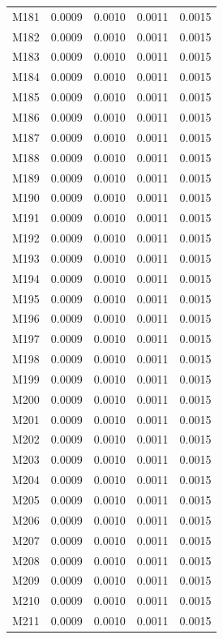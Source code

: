 \begin{longtable}{lrrrr}
M181 & 0.0009 & 0.0010 & 0.0011 & 0.0015 \\
M182 & 0.0009 & 0.0010 & 0.0011 & 0.0015 \\
M183 & 0.0009 & 0.0010 & 0.0011 & 0.0015 \\
M184 & 0.0009 & 0.0010 & 0.0011 & 0.0015 \\
M185 & 0.0009 & 0.0010 & 0.0011 & 0.0015 \\
M186 & 0.0009 & 0.0010 & 0.0011 & 0.0015 \\
M187 & 0.0009 & 0.0010 & 0.0011 & 0.0015 \\
M188 & 0.0009 & 0.0010 & 0.0011 & 0.0015 \\
M189 & 0.0009 & 0.0010 & 0.0011 & 0.0015 \\
M190 & 0.0009 & 0.0010 & 0.0011 & 0.0015 \\
M191 & 0.0009 & 0.0010 & 0.0011 & 0.0015 \\
M192 & 0.0009 & 0.0010 & 0.0011 & 0.0015 \\
M193 & 0.0009 & 0.0010 & 0.0011 & 0.0015 \\
M194 & 0.0009 & 0.0010 & 0.0011 & 0.0015 \\
M195 & 0.0009 & 0.0010 & 0.0011 & 0.0015 \\
M196 & 0.0009 & 0.0010 & 0.0011 & 0.0015 \\
M197 & 0.0009 & 0.0010 & 0.0011 & 0.0015 \\
M198 & 0.0009 & 0.0010 & 0.0011 & 0.0015 \\
M199 & 0.0009 & 0.0010 & 0.0011 & 0.0015 \\
M200 & 0.0009 & 0.0010 & 0.0011 & 0.0015 \\
M201 & 0.0009 & 0.0010 & 0.0011 & 0.0015 \\
M202 & 0.0009 & 0.0010 & 0.0011 & 0.0015 \\
M203 & 0.0009 & 0.0010 & 0.0011 & 0.0015 \\
M204 & 0.0009 & 0.0010 & 0.0011 & 0.0015 \\
M205 & 0.0009 & 0.0010 & 0.0011 & 0.0015 \\
M206 & 0.0009 & 0.0010 & 0.0011 & 0.0015 \\
M207 & 0.0009 & 0.0010 & 0.0011 & 0.0015 \\
M208 & 0.0009 & 0.0010 & 0.0011 & 0.0015 \\
M209 & 0.0009 & 0.0010 & 0.0011 & 0.0015 \\
M210 & 0.0009 & 0.0010 & 0.0011 & 0.0015 \\
M211 & 0.0009 & 0.0010 & 0.0011 & 0.0015 \\

\end{longtable}
